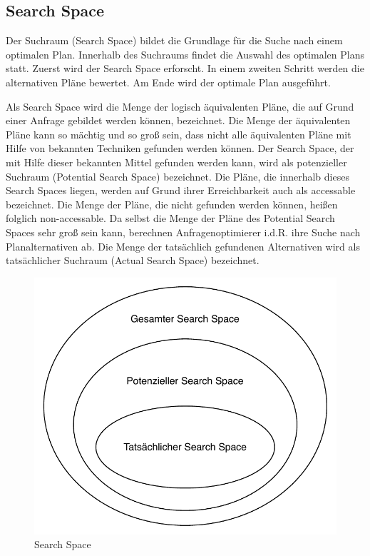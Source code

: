 \subsection{Search Space} 

Der Suchraum (Search Space) bildet die Grundlage für die Suche nach einem optimalen Plan. Innerhalb des Suchraums findet die Auswahl des optimalen Plans statt. 
Zuerst wird der Search Space erforscht. In einem zweiten Schritt werden die alternativen Pläne bewertet. Am Ende wird der optimale Plan ausgeführt.



Als Search Space wird die Menge der logisch äquivalenten Pläne, die auf Grund einer Anfrage gebildet werden können, bezeichnet. Die Menge der äquivalenten Pläne kann so mächtig und so groß sein, dass nicht alle äquivalenten Pläne mit Hilfe von bekannten Techniken gefunden werden können. Der Search Space, der mit Hilfe dieser bekannten Mittel gefunden werden kann, wird als potenzieller Suchraum (Potential Search Space) bezeichnet. Die Pläne, die innerhalb dieses Search Spaces liegen, werden auf Grund ihrer Erreichbarkeit auch als accessable bezeichnet. Die Menge der Pläne, die nicht gefunden werden können, heißen folglich non-accessable. Da selbst die Menge der Pläne des Potential Search Spaces sehr groß sein kann, berechnen Anfragenoptimierer i.d.R. ihre Suche nach Planalternativen ab. Die Menge der tatsächlich gefundenen Alternativen wird als tatsächlicher Suchraum (Actual Search Space) bezeichnet.


\begin{figure}[h]
  \centering
  \includegraphics{02_Grundlagen/SearchSpace.pdf}
  \caption{Search Space}
  \label{SearchSpace}
\end{figure}

